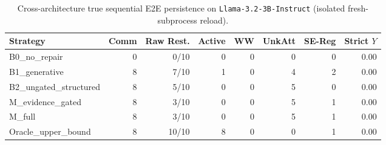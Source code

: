 \begin{table}[t]
\centering\small
\caption{Cross-architecture true sequential E2E persistence on \texttt{Llama-3.2-3B-Instruct} (isolated fresh-subprocess reload).}
\begin{tabular}{lrrrrrrr}
\toprule
Strategy & Comm & Raw Rest. & Active & WW & UnkAtt & SE-Reg & Strict $Y$ \\
\midrule
B0\_no\_repair & 0 & 0/10 & 0 & 0 & 0 & 0 & 0.00 \\
B1\_generative & 8 & 7/10 & 1 & 0 & 4 & 2 & 0.00 \\
B2\_ungated\_structured & 8 & 5/10 & 0 & 0 & 5 & 0 & 0.00 \\
M\_evidence\_gated & 8 & 3/10 & 0 & 0 & 5 & 1 & 0.00 \\
M\_full & 8 & 3/10 & 0 & 0 & 5 & 1 & 0.00 \\
Oracle\_upper\_bound & 8 & 10/10 & 8 & 0 & 0 & 1 & 0.00 \\
\bottomrule
\end{tabular}
\end{table}
